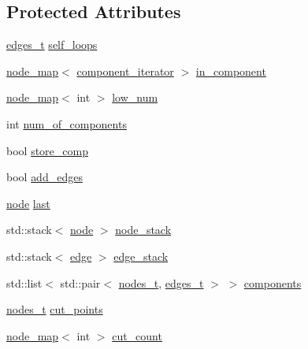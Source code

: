 \subsection*{Protected Attributes}
\begin{DoxyCompactItemize}
\item 
\mbox{\hyperlink{edge_8h_a8f9587479bda6cf612c103494b3858e3}{edges\+\_\+t}} \mbox{\hyperlink{classbiconnectivity_ad6b936f8450b97a34c93c7c2196571a1}{self\+\_\+loops}}
\item 
\mbox{\hyperlink{classnode__map}{node\+\_\+map}}$<$ \mbox{\hyperlink{classbiconnectivity_aef69aa0c23bfcd945e385350154b6483}{component\+\_\+iterator}} $>$ \mbox{\hyperlink{classbiconnectivity_a487da69817fa89ab3d1523ad9846ae8e}{in\+\_\+component}}
\item 
\mbox{\hyperlink{classnode__map}{node\+\_\+map}}$<$ int $>$ \mbox{\hyperlink{classbiconnectivity_ac5817e2122477ed591ef229c081745f3}{low\+\_\+num}}
\item 
int \mbox{\hyperlink{classbiconnectivity_a89fbd540b8a61aad150020be657ddfb7}{num\+\_\+of\+\_\+components}}
\item 
bool \mbox{\hyperlink{classbiconnectivity_a989307b07f4a976649bd7551173bd564}{store\+\_\+comp}}
\item 
bool \mbox{\hyperlink{classbiconnectivity_a70c1310b4ba83dbe10594f3a33f94763}{add\+\_\+edges}}
\item 
\mbox{\hyperlink{classnode}{node}} \mbox{\hyperlink{classbiconnectivity_a6f2e474efeb8ccb023d9b84385798193}{last}}
\item 
std\+::stack$<$ \mbox{\hyperlink{classnode}{node}} $>$ \mbox{\hyperlink{classbiconnectivity_a1223b0d8a833eb6299e82290b3e8ac8f}{node\+\_\+stack}}
\item 
std\+::stack$<$ \mbox{\hyperlink{classedge}{edge}} $>$ \mbox{\hyperlink{classbiconnectivity_a524ba263fc35d13aab5078ebfe8f5307}{edge\+\_\+stack}}
\item 
std\+::list$<$ std\+::pair$<$ \mbox{\hyperlink{edge_8h_a22ac17689106ba21a84e7bc54d1199d6}{nodes\+\_\+t}}, \mbox{\hyperlink{edge_8h_a8f9587479bda6cf612c103494b3858e3}{edges\+\_\+t}} $>$ $>$ \mbox{\hyperlink{classbiconnectivity_a5ac244b6442c1ce5b74b5d9c445f8b48}{components}}
\item 
\mbox{\hyperlink{edge_8h_a22ac17689106ba21a84e7bc54d1199d6}{nodes\+\_\+t}} \mbox{\hyperlink{classbiconnectivity_a776f4f2d5654ef6836aeb34690fdadc5}{cut\+\_\+points}}
\item 
\mbox{\hyperlink{classnode__map}{node\+\_\+map}}$<$ int $>$ \mbox{\hyperlink{classbiconnectivity_a67756de28954d13df615d8f2a93b22da}{cut\+\_\+count}}

\end{DoxyCompactItemize}
